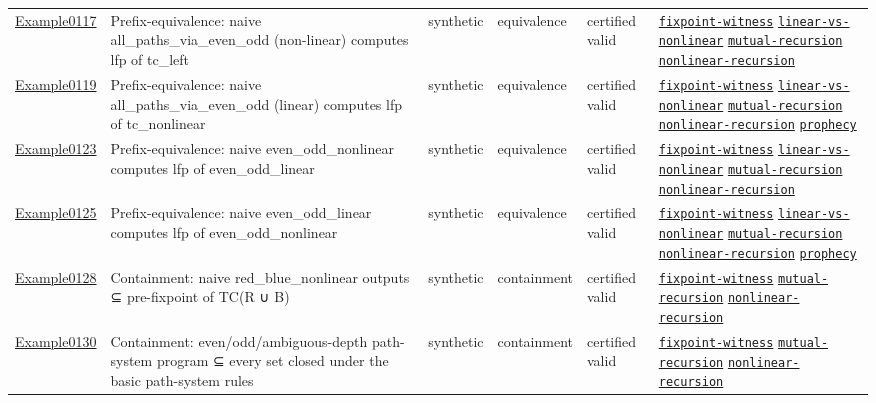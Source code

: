 \documentclass[10pt]{article}
\begin{document}
\begin{longtable}{@{}lp{}p{}p{}p{}p{}@{}}
\hyperref[case:Example0117]{Example0117} & Prefix-equivalence: naive all\_paths\_via\_even\_odd (non-linear) computes lfp of tc\_left & synthetic & equivalence & certified valid & {\scriptsize \hyperref[tag:fixpoint-witness]{\texttt{fixpoint-witness}} \hyperref[tag:linear-vs-nonlinear]{\texttt{linear-vs-nonlinear}} \hyperref[tag:mutual-recursion]{\texttt{mutual-recursion}} \hyperref[tag:nonlinear-recursion]{\texttt{nonlinear-recursion}}} \\
\hyperref[case:Example0119]{Example0119} & Prefix-equivalence: naive all\_paths\_via\_even\_odd (linear) computes lfp of tc\_nonlinear & synthetic & equivalence & certified valid & {\scriptsize \hyperref[tag:fixpoint-witness]{\texttt{fixpoint-witness}} \hyperref[tag:linear-vs-nonlinear]{\texttt{linear-vs-nonlinear}} \hyperref[tag:mutual-recursion]{\texttt{mutual-recursion}} \hyperref[tag:nonlinear-recursion]{\texttt{nonlinear-recursion}} \hyperref[tag:prophecy]{\texttt{prophecy}}} \\
\hyperref[case:Example0123]{Example0123} & Prefix-equivalence: naive even\_odd\_nonlinear computes lfp of even\_odd\_linear & synthetic & equivalence & certified valid & {\scriptsize \hyperref[tag:fixpoint-witness]{\texttt{fixpoint-witness}} \hyperref[tag:linear-vs-nonlinear]{\texttt{linear-vs-nonlinear}} \hyperref[tag:mutual-recursion]{\texttt{mutual-recursion}} \hyperref[tag:nonlinear-recursion]{\texttt{nonlinear-recursion}}} \\
\hyperref[case:Example0125]{Example0125} & Prefix-equivalence: naive even\_odd\_linear computes lfp of even\_odd\_nonlinear & synthetic & equivalence & certified valid & {\scriptsize \hyperref[tag:fixpoint-witness]{\texttt{fixpoint-witness}} \hyperref[tag:linear-vs-nonlinear]{\texttt{linear-vs-nonlinear}} \hyperref[tag:mutual-recursion]{\texttt{mutual-recursion}} \hyperref[tag:nonlinear-recursion]{\texttt{nonlinear-recursion}} \hyperref[tag:prophecy]{\texttt{prophecy}}} \\
\hyperref[case:Example0128]{Example0128} & Containment: naive red\_blue\_nonlinear outputs ⊆ pre-fixpoint of TC(R ∪ B) & synthetic & containment & certified valid & {\scriptsize \hyperref[tag:fixpoint-witness]{\texttt{fixpoint-witness}} \hyperref[tag:mutual-recursion]{\texttt{mutual-recursion}} \hyperref[tag:nonlinear-recursion]{\texttt{nonlinear-recursion}}} \\
\hyperref[case:Example0130]{Example0130} & Containment: even/odd/ambiguous-depth path-system program ⊆ every set closed under the basic path-system rules & synthetic & containment & certified valid & {\scriptsize \hyperref[tag:fixpoint-witness]{\texttt{fixpoint-witness}} \hyperref[tag:mutual-recursion]{\texttt{mutual-recursion}} \hyperref[tag:nonlinear-recursion]{\texttt{nonlinear-recursion}}} \\

\end{longtable}
\end{document}
